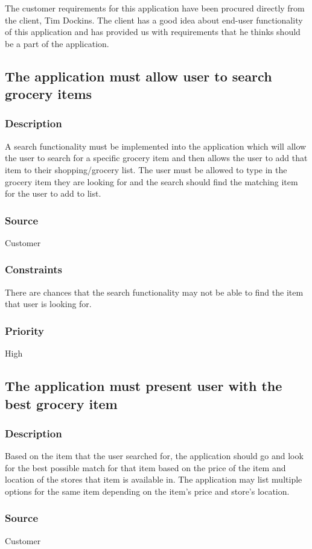 The customer requirements for this application have been procured directly from the client, Tim Dockins. The client has a good idea about end-user functionality of this application and has provided us with requirements that he thinks should be a part of the application.
\subsection{The application must allow user to search grocery items}
\subsubsection{Description}
A search functionality must be implemented into the application which will allow the user to search for a specific grocery item and then allows the user to add that item to their shopping/grocery list. The user must be allowed to type in the grocery item they are looking for and the search should find the matching item for the user to add to list.
\subsubsection{Source}
Customer
\subsubsection{Constraints}
There are chances that the search functionality may not be able to find the item that user is looking for.
\subsubsection{Priority}
High
\\
\subsection{The application must present user with the best grocery item}
\subsubsection{Description}
Based on the item that the user searched for, the application should go and look for the best possible match for that item based on the price of the item and location of the stores that item is available in. The application may list multiple options for the same item depending on the item's price and store's location.
\subsubsection{Source}
Customer
